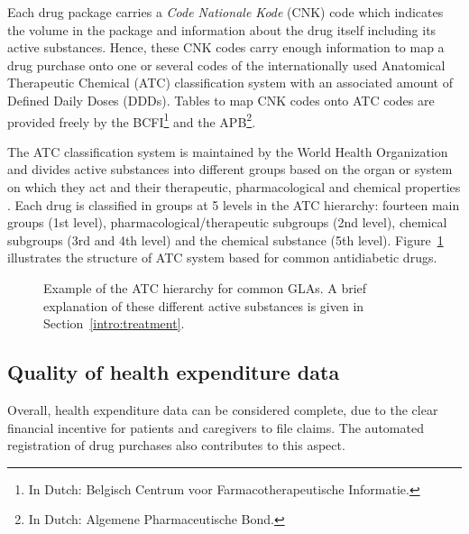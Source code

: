 Each drug package carries a \emph{Code Nationale Kode} (CNK) code which indicates the volume in the package and information about the drug itself including its active substances. Hence, these CNK codes carry enough information to map a drug purchase onto one or several codes of the internationally used Anatomical Therapeutic Chemical (ATC) classification system with an associated amount of Defined Daily Doses (DDDs). Tables to map CNK codes onto ATC codes are provided freely by the BCFI\footnote{In Dutch: Belgisch Centrum voor Farmacotherapeutische Informatie.} and the APB\footnote{In Dutch: Algemene Pharmaceutische Bond.}.

The ATC classification system is maintained by the World Health Organization and divides active substances into different groups based on the organ or system on which they act and their therapeutic, pharmacological and chemical properties \citep{world1996guidelines}. Each drug is classified in groups at 5 levels in the ATC hierarchy: fourteen main groups (1st level), pharmacological/therapeutic subgroups (2nd level), chemical subgroups (3rd and 4th level) and the chemical substance (5th level). Figure~\ref{intro:atc-example} illustrates the structure of ATC system based for common antidiabetic drugs.

\begin{figure}[!h]
\caption{Example of the ATC hierarchy for common GLAs. A brief explanation of these different active substances is given in Section~\ref{intro:treatment}.} \label{intro:atc-example}
\end{figure}


\subsection{Quality of health expenditure data}
Overall, health expenditure data can be considered complete, due to the clear financial incentive for patients and caregivers to file claims. The automated registration of drug purchases also contributes to this aspect.

